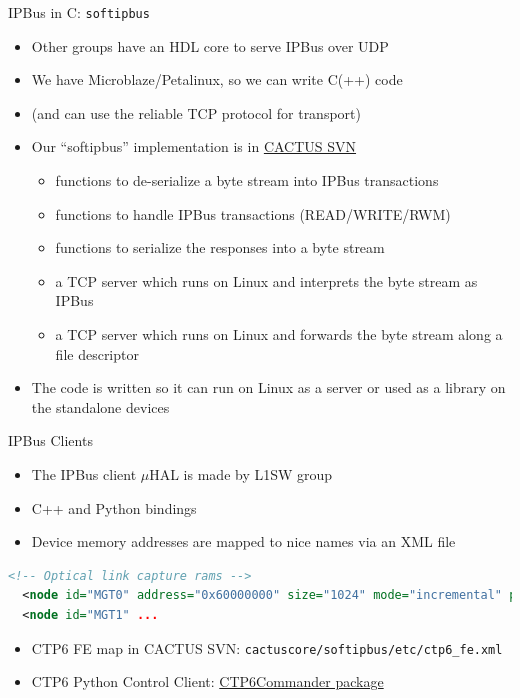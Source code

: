 \documentclass{beamer}
\begin{document}
\begin{frame}{IPBus in C: {\tt softipbus}}
\begin{itemize}
\item Other groups have an HDL core to serve IPBus over UDP
\item We have Microblaze/Petalinux, so we can write C(++) code
\item (and can use the reliable TCP protocol for transport)
\item Our ``softipbus'' implementation is in \href{https://svnweb.cern.ch/trac/cactus/browser/trunk/cactuscore/softipbus}{CACTUS SVN}
\begin{itemize}
\item functions to de-serialize a byte stream into IPBus transactions
\item functions to handle IPBus transactions (READ/WRITE/RWM)
\item functions to serialize the responses into a byte stream
\item a TCP server which runs on Linux and interprets the byte stream as IPBus
\item a TCP server which runs on Linux and forwards the byte stream along a file descriptor
\end{itemize}
\item The code is written so it can run on Linux as a server or used as a library on the standalone devices
\end{itemize}
\end{frame}

\begin{frame}[fragile]{IPBus Clients}
\begin{itemize}
\item The IPBus client $\mu$HAL is made by L1SW group
\item C++ and Python bindings
\item Device memory addresses are mapped to nice names via an XML file
\end{itemize}
\begin{lstlisting}[language=xml]
  <!-- Optical link capture rams -->
  <node id="MGT0" address="0x60000000" size="1024" mode="incremental" permission="r" description="Capture RAM for link #0"/>
  <node id="MGT1" ...
\end{lstlisting}
\begin{itemize}
\item CTP6 FE map in CACTUS SVN: {\tt cactuscore/softipbus/etc/ctp6\_fe.xml}
\item CTP6 Python Control Client: \href{https://github.com/uwcms/ctp6commander/blob/master/api.py}{CTP6Commander package}
\end{itemize}

\end{frame}
\end{document}
